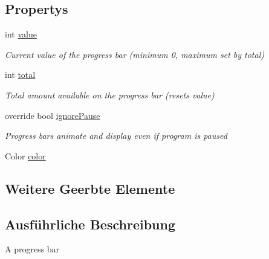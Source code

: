 \subsection*{Propertys}
\begin{DoxyCompactItemize}
\item 
int \hyperlink{class_gruppe22_1_1_client_1_1_progress_bar_a01b5256bfaae8452ff2cbc7db92adc8a}{value}
\begin{DoxyCompactList}\small\item\em Current value of the progress bar (minimum 0, maximum set by total) \end{DoxyCompactList}\item 
int \hyperlink{class_gruppe22_1_1_client_1_1_progress_bar_ae3302bc227446998679b7e4a0f67f9bb}{total}
\begin{DoxyCompactList}\small\item\em Total amount available on the progress bar (resets value) \end{DoxyCompactList}\item 
override bool \hyperlink{class_gruppe22_1_1_client_1_1_progress_bar_ab1cf4a6b7055b48199edac21328ae1ed}{ignore\-Pause}
\begin{DoxyCompactList}\small\item\em Progress bars animate and display even if program is paused \end{DoxyCompactList}\item 
Color \hyperlink{class_gruppe22_1_1_client_1_1_progress_bar_a0af6ea002815cac6dbc030d5fb1de81d}{color}
\end{DoxyCompactItemize}
\subsection*{Weitere Geerbte Elemente}


\subsection{Ausführliche Beschreibung}
A progress bar 



